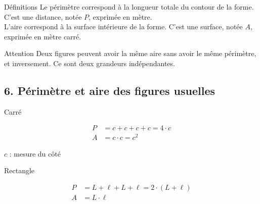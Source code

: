 \vspace{10pt}
\begin{regle}{Définitions}
Le \textcolor{themeColor}{périmètre} correspond à la longueur totale du contour de la forme. C'est une distance, notée $P$, exprimée en mètre.\\[7pt]
L'\textcolor{themeColor}{aire} correspond à la surface intérieure de la forme. C'est une surface, notée $A$, exprimée en mètre carré.
\end{regle}

\vspace{10pt}
\begin{astuce}{Attention}
Deux figures peuvent avoir la même aire sans avoir le même périmètre, et inversement. Ce sont deux grandeurs indépendantes.
\end{astuce}

\vfill
\subsection*{6. Périmètre et aire des figures usuelles}

\textcolor{themeColor}{Carré}

\begin{minipage}[c]{0.45\linewidth}
\begin{center}
\end{center}
\end{minipage}
\hfill
\begin{minipage}[c]{0.5\linewidth}
\begin{align*}
P &= c+c+c+c = 4\cdot c\\[6pt]
A &= c\cdot c = c^2
\end{align*}
\end{minipage}

\vspace{4pt}
{\small $c$ : mesure du côté}

\vspace{30pt}
\textcolor{themeColor}{Rectangle}

\begin{minipage}[c]{0.45\linewidth}
\begin{center}
\end{center}
\end{minipage}
\hfill
\begin{minipage}[c]{0.5\linewidth}
\begin{align*}
P &= L+\ell+L+\ell = 2\cdot(L+\ell)\\[6pt]
A &= L\cdot \ell
\end{align*}
\end{minipage}

